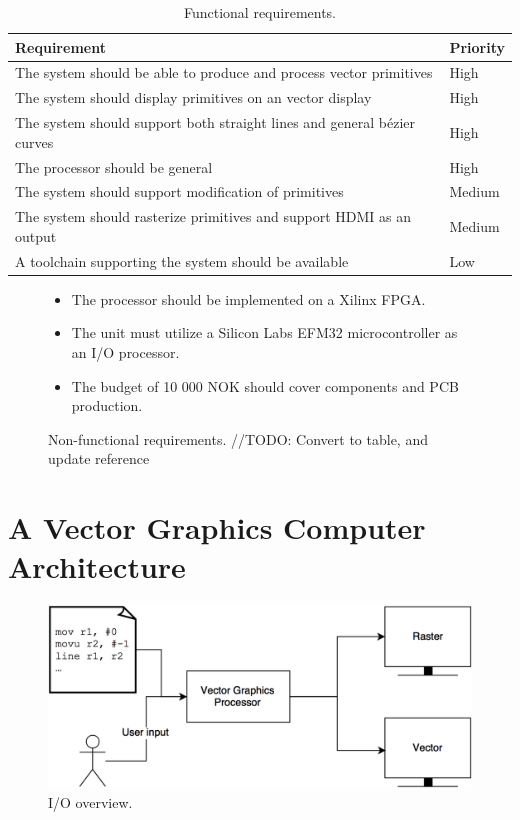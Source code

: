 \begin{table}[h!]
    \begin{tabular}{|l|l|}
        \hline
        \textbf{Requirement}                                                    & \textbf{Priority} \\ \hline
        The system should be able to produce and process vector primitives      & High     \\ \hline
        The system should display primitives on an vector display               & High     \\ \hline
        The system should support both straight lines and general bézier curves & High     \\ \hline
        The processor should be general                                         & High     \\ \hline
        The system should support modification of primitives                    & Medium   \\ \hline
        The system should rasterize primitives and support HDMI as an output    & Medium   \\ \hline
        A toolchain supporting the system should be available                   & Low      \\ \hline
    \end{tabular}
    \caption{Functional requirements.}
    \label{tbl:func_req}
\end{table}


\begin{figure}[h!]
    \begin{itemize}
        \item The processor should be implemented on a Xilinx FPGA.
        \item The unit must utilize a Silicon Labs EFM32 microcontroller as an I/O processor.
        \item The budget of 10 000 NOK should cover components and PCB production.
    \end{itemize}
    \caption{Non-functional requirements. //TODO: Convert to table, and update reference}
    \label{lst:non_func_req}
\end{figure}


\section{A Vector Graphics Computer Architecture}

\begin{figure}[H]
    \includegraphics[width=\linewidth]{images/high_level_io.png}
    \caption{I/O overview.}
    \label{fig:io-overview}
\end{figure}

